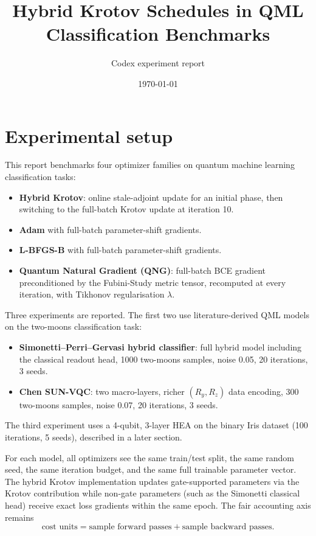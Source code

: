 \documentclass[11pt]{article}
\title{Hybrid Krotov Schedules in QML Classification Benchmarks}
\author{Codex experiment report}
\date{\today}
\begin{document}
\maketitle

\section*{Experimental setup}
This report benchmarks four optimizer families on quantum machine learning classification tasks:
\begin{itemize}
\item \textbf{Hybrid Krotov}: online stale-adjoint update for an initial phase, then switching to the full-batch Krotov update at iteration 10.
\item \textbf{Adam} with full-batch parameter-shift gradients.
\item \textbf{L-BFGS-B} with full-batch parameter-shift gradients.
\item \textbf{Quantum Natural Gradient (QNG)}: full-batch BCE gradient preconditioned by the Fubini-Study metric tensor, recomputed at every iteration, with Tikhonov regularisation $\lambda$.
\end{itemize}

Three experiments are reported. The first two use literature-derived QML models on the two-moons classification task:
\begin{itemize}
\item \textbf{Simonetti--Perri--Gervasi hybrid classifier}: full hybrid model including the classical readout head, 1000 two-moons samples, noise 0.05, 20 iterations, 3 seeds.
\item \textbf{Chen SUN-VQC}: two macro-layers, richer $(R_y,R_z)$ data encoding, 300 two-moons samples, noise 0.07, 20 iterations, 3 seeds.
\end{itemize}
The third experiment uses a 4-qubit, 3-layer HEA on the binary Iris dataset (100 iterations, 5 seeds), described in a later section.

For each model, all optimizers see the same train/test split, the same random seed, the same iteration budget, and the same full trainable parameter vector. The hybrid Krotov implementation updates gate-supported parameters via the Krotov contribution while non-gate parameters (such as the Simonetti classical head) receive exact loss gradients within the same epoch. The fair accounting axis remains
\[
\text{cost units} = \text{sample forward passes} + \text{sample backward passes}.
\]
\end{document}
